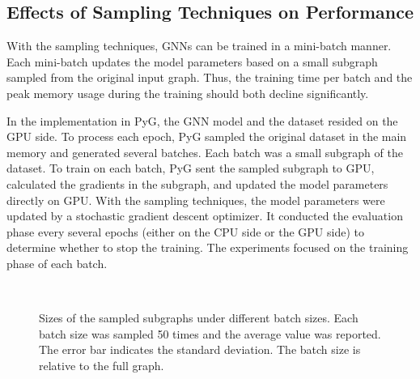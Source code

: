 \subsection{Effects of Sampling Techniques on Performance}
\label{sec:effects_of_sampling_techniques_on_performance}

With the sampling techniques, GNNs can be trained in a mini-batch manner.
Each mini-batch updates the model parameters based on a small subgraph sampled from the original input graph.
Thus, the training time per batch and the peak memory usage during the training should both decline significantly.

In the implementation in PyG, the GNN model and the dataset resided on the GPU side.
To process each epoch, PyG sampled the original dataset in the main memory and generated several batches.
Each batch was a small subgraph of the dataset.
To train on each batch, PyG sent the sampled subgraph to GPU, calculated the gradients in the subgraph, and updated the model parameters directly on GPU.
With the sampling techniques, the model parameters were updated by a stochastic gradient descent optimizer.
It conducted the evaluation phase every several epochs (either on the CPU side or the GPU side) to determine whether to stop the training.
The experiments focused on the training phase of each batch.

\begin{figure}
    \centering
     \\
    \caption{Sizes of the sampled subgraphs under different batch sizes. Each batch size was sampled 50 times and the average value was reported. The error bar indicates the standard deviation. The batch size is relative to the full graph.}
    \label{fig:exp_sampling_minibatch_graph_info}
\end{figure}

